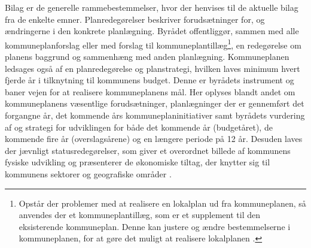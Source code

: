 \newline \indent{     }  Bilag er de generelle rammebestemmelser, hvor der henvises til de aktuelle bilag fra de enkelte emner.
\newline \indent{     }  Planredegørelser beskriver forudsætninger for, og ændringerne i den konkrete planlægning. Byrådet offentliggør, sammen med alle kommuneplanforslag eller med forslag til kommuneplantillæg\footnote{Opstår der problemer med at realisere en lokalplan ud fra kommuneplanen, så anvendes der et kommuneplantillæg, som er et supplement til den eksisterende kommuneplan. Denne kan justere og ændre bestemmelserne i kommuneplanen, for at gøre det muligt at realisere lokalplanen \citep{kommuneplan2009}.}, en redegørelse om planens baggrund og sammenhæng med anden planlægning. Kommuneplanen ledsages også af en planredegørelse og planstrategi, hvilken laves minimum hvert fjerde år i tilknytning til kommunens budget. Denne er byrådets instrument og baner vejen for at realisere kommuneplanens mål. Her oplyses blandt andet om kommuneplanens væsentlige forudsætninger, planlægninger der er gennemført det forgangne år, det kommende års kommuneplaninitiativer samt byrådets vurdering af og strategi for udviklingen for både det kommende år (budgetåret), de kommende fire år (overslagsårene) og en længere periode på 12 år. Desuden laves der jævnligt statusredegørelser, som giver et overordnet billede af kommunens fysiske udvikling og præsenterer de økonomiske tiltag, der knytter sig til kommunens sektorer og geografiske områder \citep{kommuneplan1}.

